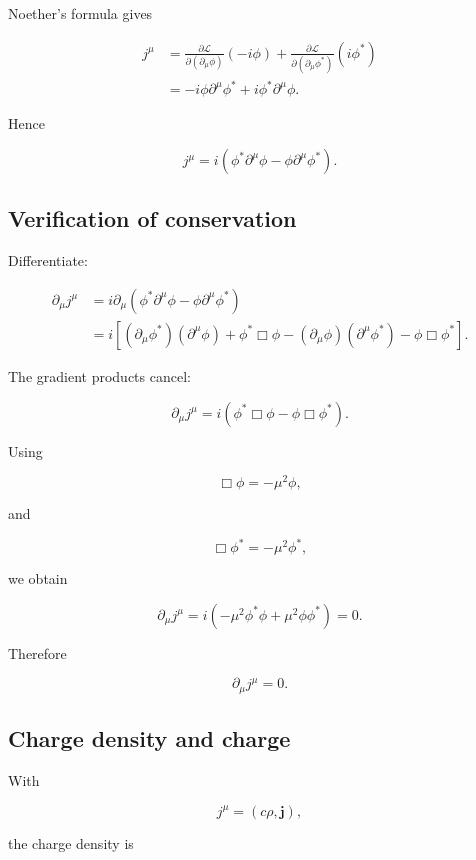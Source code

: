 Noether's formula gives

\[
\begin{aligned}
j^{\mu}
&=
\frac{\partial\mathcal{L}}
{\partial(\partial_{\mu}\phi)}
\left(
-i\phi
\right)
+
\frac{\partial\mathcal{L}}
{\partial(\partial_{\mu}\phi^{*})}
\left(
i\phi^{*}
\right)
\\
&=
-i\phi\partial^{\mu}\phi^{*}
+
i\phi^{*}\partial^{\mu}\phi.
\end{aligned}
\]

Hence

\[
\boxed{
j^{\mu}
=
i
\left(
\phi^{*}\partial^{\mu}\phi
-
\phi\partial^{\mu}\phi^{*}
\right)
}.
\]

\subsection{Verification of conservation}

Differentiate:

\[
\begin{aligned}
\partial_{\mu}j^{\mu}
&=
i
\partial_{\mu}
\left(
\phi^{*}\partial^{\mu}\phi
-
\phi\partial^{\mu}\phi^{*}
\right)
\\
&=
i
\left[
(\partial_{\mu}\phi^{*})
(\partial^{\mu}\phi)
+
\phi^{*}\Box\phi
-
(\partial_{\mu}\phi)
(\partial^{\mu}\phi^{*})
-
\phi\Box\phi^{*}
\right].
\end{aligned}
\]

The gradient products cancel:

\[
\partial_{\mu}j^{\mu}
=
i
\left(
\phi^{*}\Box\phi
-
\phi\Box\phi^{*}
\right).
\]

Using

\[
\Box\phi
=
-\mu^{2}\phi,
\]

and

\[
\Box\phi^{*}
=
-\mu^{2}\phi^{*},
\]

we obtain

\[
\partial_{\mu}j^{\mu}
=
i
\left(
-\mu^{2}\phi^{*}\phi
+
\mu^{2}\phi\phi^{*}
\right)
=
0.
\]

Therefore

\[
\boxed{
\partial_{\mu}j^{\mu}=0
}.
\]

\subsection{Charge density and charge}

With

\[
j^{\mu}
=
(c\rho,\mathbf{j}),
\]

the charge density is

